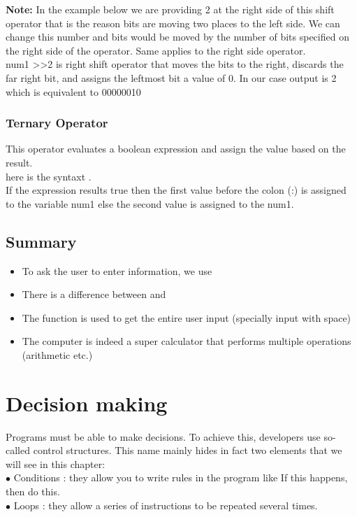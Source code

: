\documentclass[11pt, a4paper]{article}
\begin{document}
\textbf{Note:} In the example below we are providing 2 at the right side of this shift operator
that is the reason bits are moving two places to the left side. We can change this
number and bits would be moved by the number of bits specified on the right side
of the operator. Same applies to the right side operator.\\
num1 \textgreater\textgreater 2 is right shift operator that moves the bits to the right, discards
the far right bit, and assigns the leftmost bit a value of 0. In our case
output is 2 which is equivalent to 00000010


\subsubsection{Ternary Operator}
This operator evaluates a boolean expression and assign the value based on the result.\\
here is the syntaxt
.\\
If the expression results true then the first value before the colon (:)
is assigned to the variable num1 else the second value is assigned to the num1.


\subsection{Summary}
\begin{itemize}
    \item To ask the user to enter information, we use 
    \item There is a difference between  and 
    \item The function  is used to get the entire user input (specially input with space)
    \item The computer is indeed a super calculator that performs multiple operations (arithmetic etc.)
\end{itemize}

\section{Decision making}
Programs must be able to make decisions. To achieve this, developers use so-called control structures.
This name mainly hides in fact two elements that we will see in this chapter:\\
$\bullet$ Conditions : they allow you to write rules in the program like If this happens, then do this.\\
$\bullet$ Loops : they allow a series of instructions to be repeated several times.
\end{document}
